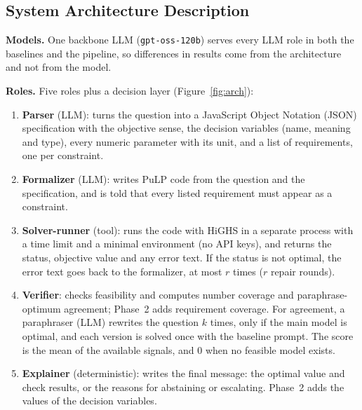\documentclass[11pt,a4paper]{article}
\begin{document}
\subsection{System Architecture Description}
\label{sec:arch}

\textbf{Models.} One backbone LLM (\texttt{gpt-oss-120b}) serves every LLM role in both the baselines and the pipeline, so differences in results come from the architecture and not from the model.

\textbf{Roles.} Five roles plus a decision layer (Figure~\ref{fig:arch}):
\begin{enumerate}[leftmargin=1.6em]
\item \textbf{Parser} (LLM): turns the question into a JavaScript Object Notation (JSON) specification with the objective sense, the decision variables (name, meaning and type), every numeric parameter with its unit, and a list of requirements, one per constraint.
\item \textbf{Formalizer} (LLM): writes PuLP code from the question and the specification, and is told that every listed requirement must appear as a constraint.
\item \textbf{Solver-runner} (tool): runs the code with HiGHS in a separate process with a time limit and a minimal environment (no API keys), and returns the status, objective value and any error text. If the status is not optimal, the error text goes back to the formalizer, at most $r$ times ($r$ repair rounds).
\item \textbf{Verifier}: checks feasibility and computes number coverage and paraphrase-optimum agreement; Phase~2 adds requirement coverage. For agreement, a paraphraser (LLM) rewrites the question $k$ times, only if the main model is optimal, and each version is solved once with the baseline prompt. The score is the mean of the available signals, and 0 when no feasible model exists.
\item \textbf{Explainer} (deterministic): writes the final message: the optimal value and check results, or the reasons for abstaining or escalating. Phase~2 adds the values of the decision variables.
\end{enumerate}
\end{document}
